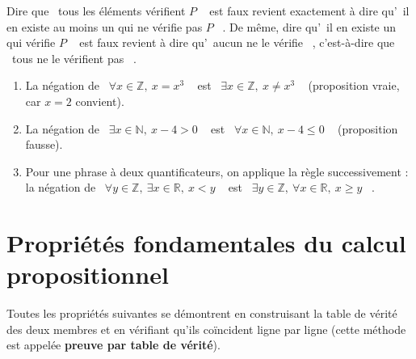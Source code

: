 \documentclass[a4paper,12pt,openany]{book}
\providecommand{\og}{\guillemotleft~}
\providecommand{\fg}{\ifhmode~\fi\guillemotright}
\begin{document}
\begin{remarque}[Intuition]
Dire que \og tous les éléments vérifient $P$ \fg{} est faux revient exactement
à dire qu'\og il en existe au moins un qui ne vérifie pas $P$ \fg. De même, dire
qu'\og il en existe un qui vérifie $P$ \fg{} est faux revient à dire
qu'\og aucun ne le vérifie \fg, c'est-à-dire que \og tous ne le vérifient pas \fg.
\end{remarque}

\begin{exemple}
\begin{enumerate}
  \item La négation de \og $\forall x \in \mathbb{Z},\ x=x^3$ \fg{} est
  \og $\exists x \in \mathbb{Z},\ x \neq x^3$ \fg{} (proposition vraie, car
  $x=2$ convient).
  \item La négation de \og $\exists x \in \mathbb{N},\ x-4>0$ \fg{} est
  \og $\forall x \in \mathbb{N},\ x-4 \leq 0$ \fg{} (proposition fausse).
  \item Pour une phrase à deux quantificateurs, on applique la règle
  successivement : la négation de \og $\forall y \in \mathbb{Z},\ \exists x \in
  \mathbb{R},\ x<y$ \fg{} est \og $\exists y \in \mathbb{Z},\ \forall x \in
  \mathbb{R},\ x \geq y$ \fg.
\end{enumerate}
\end{exemple}

\section{Propriétés fondamentales du calcul propositionnel}


Toutes les propriétés suivantes se démontrent en construisant la table de
vérité des deux membres et en vérifiant qu'ils coïncident ligne par ligne
(cette méthode est appelée \textbf{preuve par table de vérité}).
\end{document}

